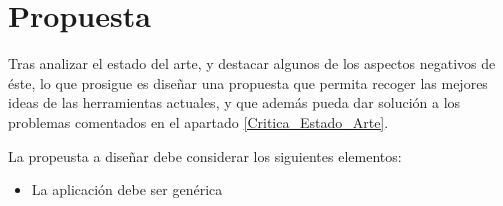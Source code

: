

\section{Propuesta} \label{Propuesta}
Tras analizar el estado del arte, y destacar algunos de los aspectos negativos de éste, lo que prosigue es diseñar una 
propuesta que permita recoger las mejores ideas de las herramientas actuales, y que además pueda dar solución a los 
problemas comentados en el apartado \ref{Critica_Estado_Arte}.

La propeusta a diseñar debe considerar los siguientes elementos:
\begin{itemize}
    \item La aplicación debe ser genérica
\end{itemize}